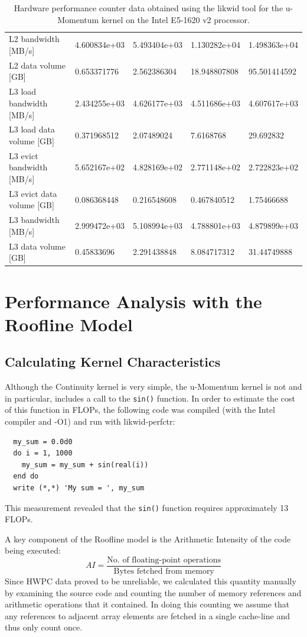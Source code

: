 \documentclass[12pt]{article}
\begin{document}
\begin{table}
\begin{tabular}{l|l|l|l|l}
L2 bandwidth [MB/s]        &  4.600834e+03 &  5.493404e+03 & 1.130282e+04 & 1.498363e+04 \\
L2 data volume [GB]        &   0.653371776 &   2.562386304 & 18.948807808 & 95.501414592 \\
\hline
L3 load bandwidth [MB/s]  &  2.434255e+03 & 4.626177e+03 & 4.511686e+03 & 4.607617e+03 \\
L3 load data volume [GB]  &   0.371968512 &  2.07489024  &   7.6168768  &   29.692832  \\
L3 evict bandwidth [MB/s] &  5.652167e+02 & 4.828169e+02 & 2.771148e+02 & 2.722823e+02 \\
L3 evict data volume [GB] &   0.086368448 &  0.216548608 &  0.467840512 &  1.75466688  \\
L3 bandwidth [MB/s]       &  2.999472e+03 & 5.108994e+03 & 4.788801e+03 & 4.879899e+03 \\
L3 data volume [GB]       &   0.45833696  &  2.291438848 &  8.084717312 &  31.44749888 \\
\hline
\hline
\end{tabular}
\caption{Hardware performance counter data obtained using the likwid
  tool for the u-Momentum kernel on the Intel E5-1620 v2 processor.}
\label{TAB_hwpc_mom_u}
\end{table}

\section{Performance Analysis with the Roofline Model}

\subsection{Calculating Kernel Characteristics}

Although the Continuity kernel is very simple, the u-Momentum kernel
is not and in particular, includes a call to the {\tt sin()} function.
In order to estimate the cost of this function in FLOPs, the following
code was compiled (with the Intel compiler and -O1) and run with
likwid-perfctr:
\begin{verbatim}
  my_sum = 0.0d0
  do i = 1, 1000
    my_sum = my_sum + sin(real(i))
  end do
  write (*,*) 'My sum = ', my_sum
\end{verbatim}
This measurement revealed that the {\tt sin()} function requires
approximately 13 FLOPs.

A key component of the Roofline model is the Arithmetic Intensity of
the code being executed:
\begin{equation}
AI = \frac{\textrm{No. of floating-point operations}}{\textrm{Bytes fetched from memory}}
\end{equation}
Since HWPC data proved to be unreliable, we calculated this quantity
manually by examining the source code and counting the number of
memory references and arithmetic operations that it contained. In
doing this counting we assume that any references to adjacent array
elements are fetched in a single cache-line and thus only count once.
\end{document}
